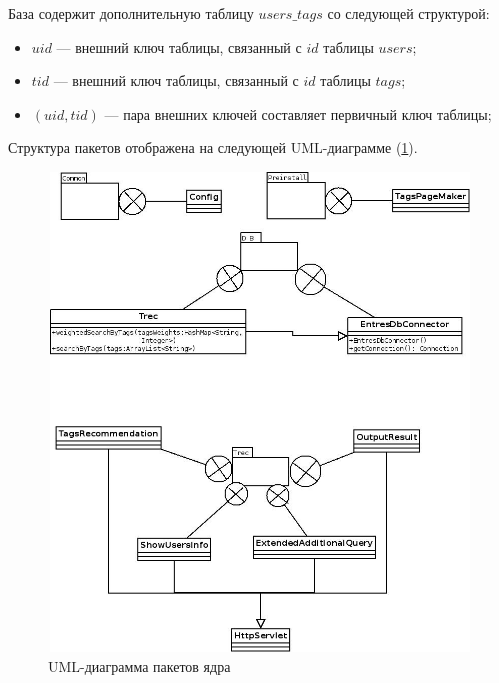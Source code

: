 База содержит дополнительную таблицу $users\_tags$ со следующей структурой:
\begin{itemize}
\item $uid$ --- внешний ключ таблицы, связанный с $id$ таблицы $users$;
\item $tid$ --- внешний ключ таблицы, связанный с $id$ таблицы $tags$;
\item $(uid, tid)$ --- пара внешних ключей составляет первичный ключ таблицы;
\end{itemize}

Структура пакетов отображена на следующей UML-диаграмме (\ref{pic:lf-packs}).
\begin{figure}
\caption{UML-диаграмма пакетов ядра}
\label{pic:lf-packs}
\begin{center}
  \includegraphics[width=5in,height=5in]{pics/core-packs-lastfm.jpeg}
\end{center}
\end{figure}

